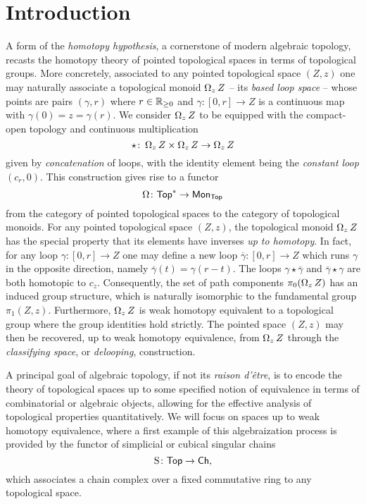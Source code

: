 
\section{Introduction}

A form of the \textit{homotopy hypothesis}, a cornerstone of modern algebraic topology, recasts the homotopy theory of pointed topological spaces in terms of topological groups.
More concretely, associated to any pointed topological space $(Z,z)$ one may naturally associate a topological monoid $\operatorname{\Omega}_z Z$ -- its \textit{based loop space} -- whose points are pairs $(\gamma, r)$ where $r \in \mathbb{R}_{\geq 0}$ and $\gamma \colon [0,r] \to Z$ is a continuous map with $\gamma(0) = z = \gamma(r)$.
We consider $\operatorname{\Omega}_z Z$ to be equipped with the compact-open topology and continuous multiplication
\[
\star \colon \operatorname{\Omega}_z Z \times \operatorname{\Omega}_z Z \to \operatorname{\Omega}_z Z
\]
given by \textit{concatenation} of loops, with the identity element being the \textit{constant loop} $(c_r,0)$.
This construction gives rise to a functor
\[
\operatorname{\Omega} \colon \mathsf{Top}^{\ast} \to \mathsf{Mon}_{\mathsf{Top}}
\]
from the category of pointed topological spaces to the category of topological monoids.
For any pointed topological space $(Z,z)$, the topological monoid $\operatorname{\Omega}_z Z$ has the special property that its elements have inverses \textit{up to homotopy}.
In fact, for any loop $\gamma \colon [0,r] \to Z $ one may define a new loop $\overline{\gamma} \colon [0,r] \to Z$ which runs $\gamma$ in the opposite direction, namely $\overline{\gamma}(t) = \gamma(r-t)$.
The loops $\gamma \star \overline{\gamma}$ and $\overline{\gamma} \star \gamma$ are both homotopic to $c_z$.
Consequently, the set of path components $\pi_0(\operatorname{\Omega}_z Z)$ has an induced group structure, which is naturally isomorphic to the fundamental group $\pi_1(Z,z)$.
Furthermore, $\operatorname{\Omega}_z Z$ is weak homotopy equivalent to a topological group where the group identities hold strictly.
The pointed space $(Z,z)$ may then be recovered, up to weak homotopy equivalence, from $\operatorname{\Omega}_z Z$ through the \textit{classifying space}, or \textit{delooping}, construction.

A principal goal of algebraic topology, if not its \textit{raison d'\^{e}tre}, is to encode the theory of topological spaces up to some specified notion of equivalence in terms of combinatorial or algebraic objects, allowing for the effective analysis of topological properties quantitatively.
We will focus on spaces up to weak homotopy equivalence, where a first example of this algebraization process is provided by the functor of simplicial or cubical singular chains
\[
\operatorname{S} \colon \mathsf{Top} \to \mathsf{Ch},
\]
which associates a chain complex over a fixed commutative ring to any topological space.

